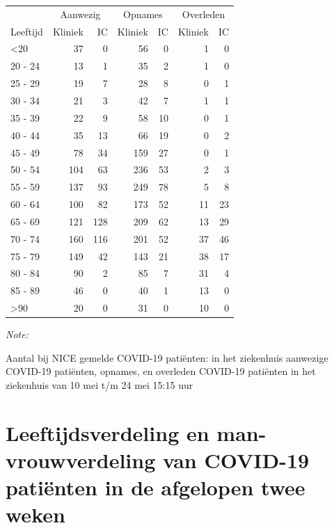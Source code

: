 \documentclass[
  english,
  man,floatsintext]{apa6}
\begin{document}
\begin{table}
\centering\begingroup\fontsize{10}{12}\selectfont

\begin{threeparttable}
\begin{tabular}{lrrrrrr}
\toprule
\multicolumn{1}{c}{ } & \multicolumn{2}{c}{Aanwezig} & \multicolumn{2}{c}{Opnames} & \multicolumn{2}{c}{Overleden} \\
\cmidrule(l{3pt}r{3pt}){2-3} \cmidrule(l{3pt}r{3pt}){4-5} \cmidrule(l{3pt}r{3pt}){6-7}
Leeftijd & Kliniek & IC & Kliniek & IC & Kliniek & IC\\
\midrule
<20 & 37 & 0 & 56 & 0 & 1 & 0\\
20 - 24 & 13 & 1 & 35 & 2 & 1 & 0\\
25 - 29 & 19 & 7 & 28 & 8 & 0 & 1\\
30 - 34 & 21 & 3 & 42 & 7 & 1 & 1\\
35 - 39 & 22 & 9 & 58 & 10 & 0 & 1\\
40 - 44 & 35 & 13 & 66 & 19 & 0 & 2\\
45 - 49 & 78 & 34 & 159 & 27 & 0 & 1\\
50 - 54 & 104 & 63 & 236 & 53 & 2 & 3\\
55 - 59 & 137 & 93 & 249 & 78 & 5 & 8\\
60 - 64 & 100 & 82 & 173 & 52 & 11 & 23\\
65 - 69 & 121 & 128 & 209 & 62 & 13 & 29\\
70 - 74 & 160 & 116 & 201 & 52 & 37 & 46\\
75 - 79 & 149 & 42 & 143 & 21 & 38 & 17\\
80 - 84 & 90 & 2 & 85 & 7 & 31 & 4\\
85 - 89 & 46 & 0 & 40 & 1 & 13 & 0\\
>90 & 20 & 0 & 31 & 0 & 10 & 0\\
\bottomrule
\end{tabular}
\begin{tablenotes}
\item \textit{Note: } 
\item Aantal bij NICE gemelde COVID-19 patiënten: in het ziekenhuis aanwezige COVID-19 patiënten, opnames, en overleden COVID-19 patiënten in het ziekenhuis van 10 mei t/m 24 mei 15:15 uur
\end{tablenotes}
\end{threeparttable}
\endgroup{}
\end{table}

\newpage

\hypertarget{leeftijdsverdeling-en-man-vrouwverdeling-van-covid-19-patiuxebnten-in-de-afgelopen-twee-weken}{%
\section{Leeftijdsverdeling en man-vrouwverdeling van COVID-19 patiënten in de afgelopen twee weken}\label{leeftijdsverdeling-en-man-vrouwverdeling-van-covid-19-patiuxebnten-in-de-afgelopen-twee-weken}}
\end{document}
